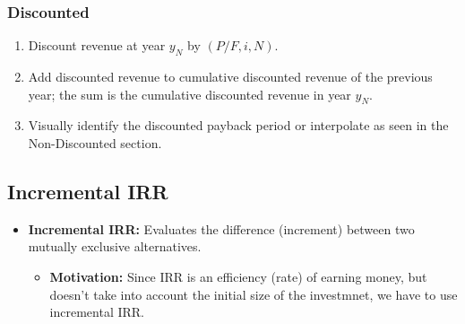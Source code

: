     \begin{example}
    \end{example}

\subsubsection{Discounted}
    \begin{process}
        \begin{enumerate}
            \item Discount revenue at year $y_N$ by $(P/F, i, N)$.
            \item Add discounted revenue to cumulative discounted revenue of the previous year; the sum is the cumulative discounted revenue in year $y_N$.
            \item Visually identify the discounted payback period or interpolate as seen in the Non-Discounted section.
        \end{enumerate}
    \end{process}

    \begin{example}
    \end{example}

\subsection{Incremental IRR}
\begin{terminology}
    \begin{itemize}
        \item \textbf{Incremental IRR:} Evaluates the difference (increment) between two mutually exclusive alternatives.
        \begin{itemize}
            \item \textbf{Motivation:} Since IRR is an efficiency (rate) of earning money, but doesn't take into account the initial size of the investmnet, we have to use incremental IRR.
        \end{itemize}
    \end{itemize}
\end{terminology}

